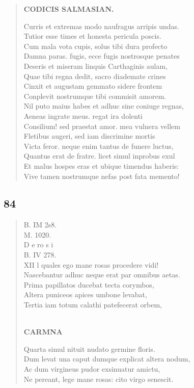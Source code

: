 \documentclass[11pt, a4paper]{report}
\begin{document}
\begin{verse}
    \begin{center} \textbf{CODICIS SALMASIAN.} \end{center} \marginpar{[119]} Curris et extremas modo naufragus arripis undas. \\ Tutior esse times et honesta pericula poscis. \\ Cum mala vota cupis, solus tibi dura profecto \\ Damna paras. fugis, ecce fugis nostrosque penates \\ Deseris et miseram linquis Carthaginis aulam, \\ Quae tibi regna dedit, sacro diademate crines \\ Cinxit et augustam gemmato sidere frontem \\ Conplevit nostrumque tibi commisit amorem. \\ Nil puto maius habes et adhuc sine coniuge regnas, \\ Aeneas ingrate meus. regat ira dolenti \\ Consilium! sed praestat amor. mea vulnera vellem \\ Fletibus augeri, sed iam discrimine mortis \\ Victa feror. neque enim tantus de funere luctus, \\ Quantus erat de fratre. licet simul inprobus exul \\ Et malus hospes eras et ubique timendus haberis: \\ Vive tamen nostrumque nefas post fata memento! \\ 
      \end{verse}
  
            \subsection*{84}
      \begin{verse}
      B. IM 2s8. \\ M. 1020. \\ D e ro s i \\ B. IV 278. \\ XII  \lbrack l quales ego mane rosas procedere vidi! \\ Nascebantur adhuc neque erat par omnibus aetas. \\ Prima papillatos ducebat  \lbrack tecta \rbrack  corymbos, \\ Altera puniceos apices umbone levabat, \\ Tertia iam totum calathi patefecerat orbem, \\ 
        ﻿\pagebreak 
     \marginpar{[120]} \begin{center} \textbf{CARMNA} \end{center}Quarta simul nituit nudato germine floris. \\ Dum levat una caput dumque explicat altera nodum, \\ Ac dum virgineus pudor exsinuatur amictu, \\ Ne pereant, lege mane rosas:  \lbrack cito \rbrack  virgo senescit. \\ 
      \end{verse}
  
\end{document}
